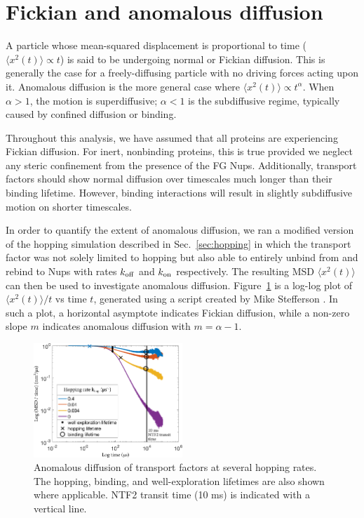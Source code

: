 \section{Fickian and anomalous diffusion}
\label{sec:fickian}
A particle whose mean-squared displacement is proportional to time ($\langle x^2(t) \rangle \propto t$) is said to be undergoing normal or Fickian diffusion.  This is generally the case for a freely-diffusing particle with no driving forces acting upon it.  Anomalous diffusion is the more general case where $\langle x^2(t)\rangle \propto t^\alpha$.  When $\alpha > 1$, the motion is superdiffusive; $\alpha < 1$ is the subdiffusive regime, typically caused by confined diffusion or binding.

Throughout this analysis, we have assumed that all proteins are experiencing Fickian diffusion.  For inert, nonbinding proteins, this is true provided we neglect any steric confinement from the presence of the FG Nups.  Additionally, transport factors should show normal diffusion over timescales much longer than their binding lifetime.  However, binding interactions will result in slightly subdiffusive motion on shorter timescales.

In order to quantify the extent of anomalous diffusion, we ran a modified version of the hopping simulation described in Sec.~\ref{sec:hopping} in which the transport factor was not solely limited to hopping but also able to entirely unbind from and rebind to Nups with rates $k_{\rm off}$ and $k_{\rm on}$ respectively.   The resulting MSD $\langle x^2(t) \rangle$ can then be used to investigate anomalous diffusion.  Figure~\ref{fig:anomalous-diffusion} is a log-log plot of $\langle x^2(t) \rangle/t$ vs time $t$, generated using a script created by Mike Stefferson \cite{stefferson18}.  In such a plot, a horizontal asymptote indicates Fickian diffusion, while a non-zero slope $m$ indicates anomalous diffusion with $m = \alpha -1$.

\begin{figure}
\centering
\includegraphics[width=0.5\textwidth]{figs/ch02/171103-DvsT-with-lifetimes.pdf}
\caption[Anomalous diffusion in the hopping simulation.]{Anomalous diffusion of transport factors at several hopping rates.  The hopping, binding, and well-exploration lifetimes are also shown where applicable.  NTF2 transit time (10 ms) is indicated with a vertical line.}
\label{fig:anomalous-diffusion}
\end{figure}

